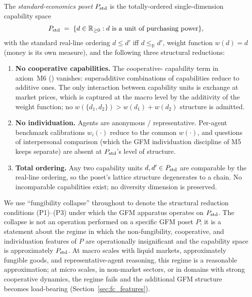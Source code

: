 \begin{definition}
\label{def:pstd}
The \emph{standard-economics poset} $P_{\mathrm{std}}$ is the totally-ordered
single-dimension capability space
\[
  P_{\mathrm{std}} \;=\; \{ d \in \mathbb{R}_{\geq 0} : d
  \text{ is a unit of purchasing power} \},
\]
with the standard real-line ordering $d \leq d'$ iff $d \leq_{\mathbb{R}}
d'$, weight function $w(d) = d$ (money is its own measure), and the
following three structural reductions:
\begin{enumerate}
\item[(P1)] \textbf{No cooperative capabilities.}  The cooperative-
  capability term in axiom~M6
  (\citep[Proposition~1]{lasser2026poset}) vanishes: superadditive
  combinations of capabilities reduce to additive ones.  The only
  interaction between capability units is exchange at market prices,
  which is captured at the macro level by the additivity of the weight
  function; no $w(\{d_1, d_2\}) > w(d_1) + w(d_2)$ structure is
  admitted.
\item[(P2)] \textbf{No individuation.}  Agents are anonymous /
  representative.  Per-agent benchmark calibrations $w_i(\cdot)$
  reduce to the common $w(\cdot)$, and questions of interpersonal
  comparison (which the GFM individuation discipline of M5 keeps
  separate) are absent at $P_{\mathrm{std}}$'s level of structure.
\item[(P3)] \textbf{Total ordering.}  Any two capability units $d,
  d' \in P_{\mathrm{std}}$ are comparable by the real-line ordering, so the
  poset's lattice structure degenerates to a chain.  No incomparable
  capabilities exist; no diversity dimension is preserved.
\end{enumerate}
\end{definition}

\begin{remark}
\label{rem:fc_collapse}
We use ``fungibility collapse'' throughout to denote the structural
reduction conditions (P1)--(P3) under which the GFM apparatus operates
on $P_{\mathrm{std}}$.  The collapse is not an operation performed on a specific
GFM poset $P$; it is a statement about the regime in which the
non-fungibility, cooperative, and individuation features of $P$ are
operationally insignificant and the capability space is approximately
$P_{\mathrm{std}}$.  At macro scales with liquid markets, approximately fungible
goods, and representative-agent reasoning, this regime is a reasonable
approximation; at micro scales, in non-market sectors, or in domains
with strong cooperative dynamics, the regime fails and the additional
GFM structure becomes load-bearing
(Section~\ref{sec:fc_features}).
\end{remark}

